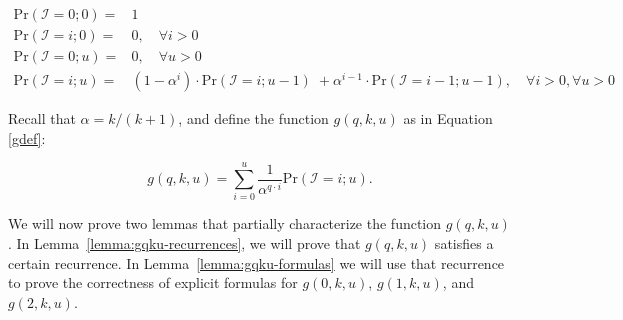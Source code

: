 \documentclass{article}
\begin{document}
\begin{align*}
\mathrm{Pr}(\mathcal{I}\!=\!0 ; 0) = & 1 \\
\mathrm{Pr}(\mathcal{I}\!=\!i ; 0) = & 0, \quad \forall i > 0 \\
\mathrm{Pr}(\mathcal{I}\!=\!0 ; u) = & 0, \quad \forall u > 0 \\
\mathrm{Pr}(\mathcal{I}\!=\!i ; u) = & (1 - \alpha^i) \cdot \mathrm{Pr}(\mathcal{I}\!=\!i ; u\!-\!1) \; +
 \alpha^{i\!-\!1} \cdot \mathrm{Pr}(\mathcal{I}\!=\!i\!-\!1 ; u\!-\!1), \quad \forall i\!>\!0, \forall u\!>\!0
\end{align*}

Recall that $\alpha = k/(k+1)$, and define the function $g(q,k,u)$ as in Equation \eqref{gdef}:

\begin{equation*}
g(q,k,u) = \sum_{i=0}^u \frac{1}{\alpha^{q \cdot i}} \mathrm{Pr}(\mathcal{I}\!=\!i;u).
\end{equation*}

We will now prove two lemmas that partially characterize the function $g(q,k,u)$.
In Lemma~\ref{lemma:gqku-recurrences},  
we will prove that $g(q,k,u)$ satisfies a certain recurrence. In Lemma~\ref{lemma:gqku-formulas}
we will use that recurrence to prove the correctness of explicit formulas for 
$g(0,k,u)$, $g(1,k,u)$, and $g(2,k,u)$.
\end{document}
